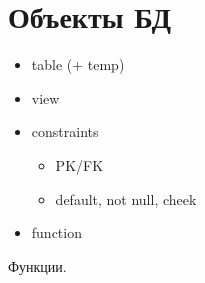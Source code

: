 \section{Объекты БД}

\begin{itemize}
	\item table (+ temp)
	\item view
	\item constraints
	      \begin{itemize}
		      \item PK/FK
		      \item default, not null, cheek
	      \end{itemize}
	\item function
\end{itemize}

Функции.

